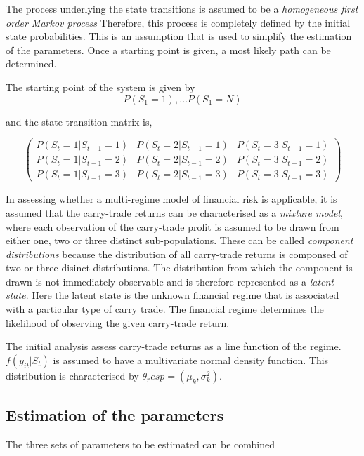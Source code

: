 \documentclass[12pt, a4paper, oneside]{article} %
\begin{document}
The process underlying the state transitions is assumed to be a \emph{homogeneous first order Markov process}  Therefore, this process is completely defined by the initial state probabilities. This is an assumption that is used to simplify the estimation of the parameters. Once a starting point is given, a most likely path can be determined. 


The starting point of the system is given by
\begin{equation*}
P(S_1 = 1), \dots P(S_1 = N)
\end{equation*}

and the state transition matrix is, 

\begin{equation*}
\begin{pmatrix}
P(S_t = 1|S_{t-1}=1) & P(S_t = 2|S_{t-1}=1) & P(S_t = 3|S_{t-1}=1)\\
P(S_t = 1|S_{t-1}=2) & P(S_t = 2|S_{t-1}=2) & P(S_t = 3|S_{t-1}=2)\\
P(S_t = 1|S_{t-1}=3) & P(S_t = 2|S_{t-1}=3) & P(S_t = 3|S_{t-1}=3)
\end{pmatrix}
\end{equation*}



In assessing whether a multi-regime model of financial risk is applicable, it is assumed that the carry-trade returns can be characterised as a \emph{mixture model}, where each observation of the carry-trade profit is assumed to be drawn from either one, two or three distinct sub-populations.  These can be called \emph{component distributions} because the distribution of all carry-trade returns is componsed of two or three disinct distributions.  The distribution from which the component is drawn is not immediately observable and is therefore represented as a \emph{latent state}.  Here the latent state is the unknown financial regime that is associated with a particular type of carry trade.  The financial regime determines the likelihood of observing the given carry-trade return. 


The initial analysis assess carry-trade returns as a line function of the regime. 
$f(y_{it}|S_t)$ is assumed to have a multivariate normal density function. This distribution is characterised by $\theta_resp = (\mu_k, \sigma_k^2)$. 

\subsection{Estimation of the parameters}
The three sets of parameters to be estimated can be combined 
\end{document}
